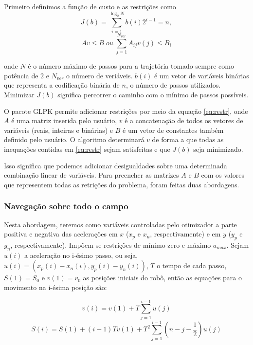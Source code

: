 \documentclass[a4paper,12pt]{article}
\begin{document}
Primeiro definimos a função de custo e as restrições como 
\begin{equation}
	\label{eq:custo}
	J(b) = \sum_{i=1}^{\log_2 {N}} b(i)2^{i-1} = n,
\end{equation}
\begin{equation}
	\label{eq:restr}
	Av \leq B \; ou \; \sum_{j=1}^{N_{var}} A_{ij}v(j)  \leqslant B_i
\end{equation}

onde $N$ é o número máximo de passos para a trajetória tomado sempre como potência de $2$ e $N_{ver}$ o número de veriáveis. $b(i)$ é um vetor de variáveis binárias que representa a codificação binária de $n$, o número de passos utilizados. Minimizar $J(b)$ significa percorrer o caminho com o mínimo de passos possíveis.

O pacote GLPK permite adicionar restrições por meio da equação \eqref{eq:restr}, onde $A$ é uma matriz inserida pelo usuário, $v$ é a concatenação de todos os vetores de variáveis (reais, inteiras e binárias) e $B$ é um vetor de constantes também definido pelo usuário. O algoritmo determinará $v$ de forma a que todas as inequações contidas em \eqref{eq:restr} sejam satisfeitas e que $J(b)$ seja minimizado.

Isso significa que podemos adicionar desigualdades sobre uma determinada combinação linear de variáveis. Para preencher as matrizes $A$ e $B$ com os valores que representem todas as retrições do problema, foram feitas duas abordagens.

\subsubsection{Navegação sobre todo o campo}

Nesta abordagem, teremos como variáveis controladas pelo otimizador a parte positiva e negativa das acelerações em $x$ ($x_{p}$ e $x_{n}$, respectivamente) e em $y$ ($y_{p}$ e $y_{n}$, respectivamente). Impõem-se restrições de mínimo zero e máximo $a_{max}$. Sejam $u(i)$ a aceleração no i-ésimo passo, ou seja, $u(i) = (x_{p}(i)-x_{n}(i), y_{p}(i)-y_{n}(i))$, $T$ o tempo de cada passo, $S(1)=S_{0}$ e $v(1)=v_{0}$ as posições iniciais do robô, então as equações para o movimento na i-ésima posição são:

\begin{equation}
	v(i) = v(1) + T\sum_{j=1}^{i-1}u(j)
\end{equation}
\begin{equation}
	S(i) = S(1) + (i-1)Tv(1) + T^2\sum_{j=1}^{i-1}(n-j-\frac{1}{2})u(j)
\end{equation}
\end{document}
